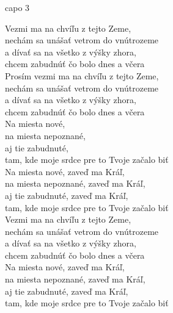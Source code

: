 
\hfill capo 3


Vezmi ma na chvíľu z tejto Zeme, \\
nechám sa unášať vetrom do vnútrozeme \\
a dívať sa na všetko z výšky zhora, \\
chcem zabudnúť čo bolo dnes a včera \\

Prosím vezmi ma na chvíľu z tejto Zeme, \\
nechám sa unášať vetrom do vnútrozeme \\
a dívať sa na všetko z výšky zhora, \\
chcem zabudnúť čo bolo dnes a včera \\

Na miesta nové, \\
na miesta nepoznané, \\
aj tie zabudnuté, \\
tam, kde moje srdce pre to Tvoje začalo biť \\

Na miesta nové, zaveď ma Kráľ, \\
na miesta nepoznané, zaveď ma Kráľ, \\
aj tie zabudnuté, zaveď ma Kráľ, \\
tam, kde moje srdce pre to Tvoje začalo biť \\

Vezmi ma na chvíľu z tejto Zeme, \\
nechám sa unášať vetrom do vnútrozeme \\
a dívať sa na všetko z výšky zhora, \\
chcem zabudnúť čo bolo dnes a včera \\

Na miesta nové, zaveď ma Kráľ, \\
na miesta nepoznané, zaveď ma Kráľ, \\
aj tie zabudnuté, zaveď ma Kráľ, \\
tam, kde moje srdce pre to Tvoje začalo biť

\newpage
